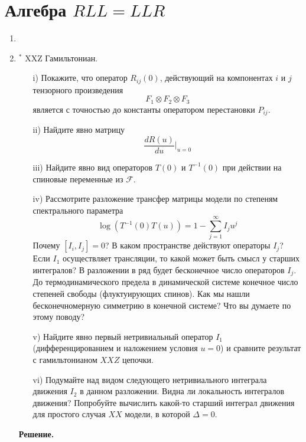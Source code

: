 \documentclass[12pt]{article}
\theoremstyle{definition}
\begin{document}
\section{Алгебра $RLL=LLR$}
\begin{enumerate}
    \item 
    \item $^*$ XXZ Гамильтониан.
    \begin{itemize}
        \item[i)] Покажите, что оператор $R_{ij}(0)$, действующий на компонентах $i$ и $j$ тензорного произведения
        \begin{equation}
            F_1\otimes F_2\otimes F_3
        \end{equation}
        является с точностью до константы оператором перестановки $P_{ij}$.
        \item[ii)] Найдите явно матрицу
        \begin{equation}
            \frac{dR(u)}{du}|_{u=0}
        \end{equation}
        \item[iii)] Найдите явно вид операторов $T(0)$ и $T^{-1}(0)$ при действии на спиновые переменные из $\mathcal{F}$.
        \item[iv)] Рассмотрите разложение трансфер матрицы модели по степеням спектрального параметра
        \begin{equation}
            \log(T^{-1}(0)T(u))=1-\sum\limits_{j=1}^\infty I_ju^j
        \end{equation}
        Почему $[I_i,I_j]=0$? В каком пространстве действуют операторы $I_j$? Если $I_1$ осуществляет трансляции, то какой может быть смысл у старших интегралов? В разложении в ряд будет бесконечное число операторов $I_j$. До термодинамического предела в динамической системе конечное число степеней свободы (флуктуирующих спинов). Как мы нашли бесконечномерную симметрию в конечной системе? Что вы думаете по этому поводу?
        \item[v)] Найдите явно первый нетривиальный оператор $I_1$ (дифференцированием и наложением условия $u=0$) и сравните результат с гамильтонианом $XXZ$ цепочки.
        \item[vi)] Подумайте над видом следующего нетривиального интеграла движения $I_2$ в данном разложении. Видна ли локальность интегралов движения? Попробуйте вычислить какой-то старший интеграл движения для простого случая $XX$ модели, в которой $\Delta=0$.
    \end{itemize}
    \textbf{Решение.}
    \begin{itemize}

\end{itemize}
\end{enumerate}
\end{document}
